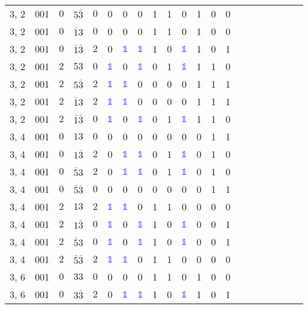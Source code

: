 \begin{longtable*}{c| cccccccccccccccccccc }
3, 2& 001& $0$& $5\bar{3}$& $0$& 0& 0& 0& 1& 1& 0& 1& 0& 0\\
3, 2& 001& $0$& $\bar{1}3$& $0$& 0& 0& 0& 1& 1& 0& 1& 0& 0\\
3, 2& 001& $0$& $\bar{1}\bar{3}$& $2$& 0& \textcolor{blue}{$\mathds{1}$}& \textcolor{blue}{$\mathds{1}$}& 1& 0& \textcolor{blue}{$\mathds{1}$}& 1& 0& 1\\
3, 2& 001& $2$& $53$& $0$& \textcolor{blue}{$\mathds{1}$}& 0& \textcolor{blue}{$\mathds{1}$}& 0& 1& \textcolor{blue}{$\mathds{1}$}& 1& 1& 0\\
3, 2& 001& $2$& $5\bar{3}$& $2$& \textcolor{blue}{$\mathds{1}$}& \textcolor{blue}{$\mathds{1}$}& 0& 0& 0& 0& 1& 1& 1\\
3, 2& 001& $2$& $\bar{1}3$& $2$& \textcolor{blue}{$\mathds{1}$}& \textcolor{blue}{$\mathds{1}$}& 0& 0& 0& 0& 1& 1& 1\\
3, 2& 001& $2$& $\bar{1}\bar{3}$& $0$& \textcolor{blue}{$\mathds{1}$}& 0& \textcolor{blue}{$\mathds{1}$}& 0& 1& \textcolor{blue}{$\mathds{1}$}& 1& 1& 0\\
3, 4& 001& $0$& $13$& $0$& 0& 0& 0& 0& 0& 0& 0& 1& 1\\
3, 4& 001& $0$& $1\bar{3}$& $2$& 0& \textcolor{blue}{$\mathds{1}$}& \textcolor{blue}{$\mathds{1}$}& 0& 1& \textcolor{blue}{$\mathds{1}$}& 0& 1& 0\\
3, 4& 001& $0$& $\bar{5}3$& $2$& 0& \textcolor{blue}{$\mathds{1}$}& \textcolor{blue}{$\mathds{1}$}& 0& 1& \textcolor{blue}{$\mathds{1}$}& 0& 1& 0\\
3, 4& 001& $0$& $\bar{5}\bar{3}$& $0$& 0& 0& 0& 0& 0& 0& 0& 1& 1\\
3, 4& 001& $2$& $13$& $2$& \textcolor{blue}{$\mathds{1}$}& \textcolor{blue}{$\mathds{1}$}& 0& 1& 1& 0& 0& 0& 0\\
3, 4& 001& $2$& $1\bar{3}$& $0$& \textcolor{blue}{$\mathds{1}$}& 0& \textcolor{blue}{$\mathds{1}$}& 1& 0& \textcolor{blue}{$\mathds{1}$}& 0& 0& 1\\
3, 4& 001& $2$& $\bar{5}3$& $0$& \textcolor{blue}{$\mathds{1}$}& 0& \textcolor{blue}{$\mathds{1}$}& 1& 0& \textcolor{blue}{$\mathds{1}$}& 0& 0& 1\\
3, 4& 001& $2$& $\bar{5}\bar{3}$& $2$& \textcolor{blue}{$\mathds{1}$}& \textcolor{blue}{$\mathds{1}$}& 0& 1& 1& 0& 0& 0& 0\\
3, 6& 001& $0$& $33$& $0$& 0& 0& 0& 1& 1& 0& 1& 0& 0\\
3, 6& 001& $0$& $3\bar{3}$& $2$& 0& \textcolor{blue}{$\mathds{1}$}& \textcolor{blue}{$\mathds{1}$}& 1& 0& \textcolor{blue}{$\mathds{1}$}& 1& 0& 1\\

\end{longtable*}
